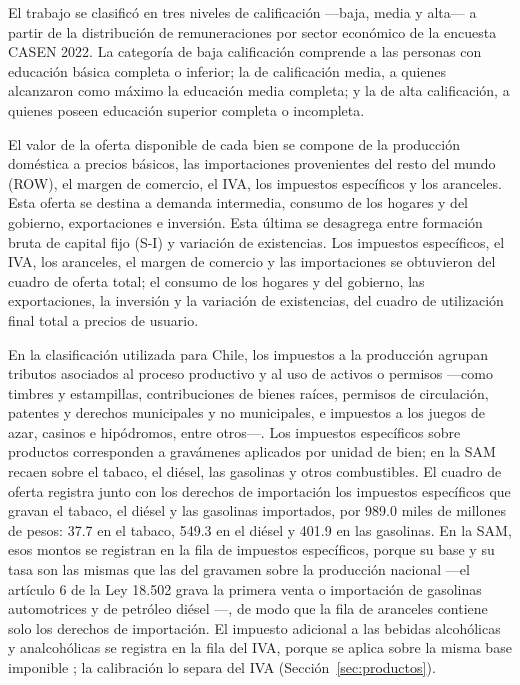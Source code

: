 \documentclass[11pt]{article}
\begin{document}
El trabajo se clasificó en tres niveles de calificación ---baja, media y alta--- a partir de la distribución de remuneraciones por sector económico de la encuesta CASEN 2022. La categoría de baja calificación comprende a las personas con educación básica completa o inferior; la de calificación media, a quienes alcanzaron como máximo la educación media completa; y la de alta calificación, a quienes poseen educación superior completa o incompleta.

El valor de la oferta disponible de cada bien se compone de la producción doméstica a precios básicos, las importaciones provenientes del resto del mundo (ROW), el margen de comercio, el IVA, los impuestos específicos y los aranceles. Esta oferta se destina a demanda intermedia, consumo de los hogares y del gobierno, exportaciones e inversión. Esta última se desagrega entre formación bruta de capital fijo (S-I) y variación de existencias. Los impuestos específicos, el IVA, los aranceles, el margen de comercio y las importaciones se obtuvieron del cuadro de oferta total; el consumo de los hogares y del gobierno, las exportaciones, la inversión y la variación de existencias, del cuadro de utilización final total a precios de usuario.

En la clasificación utilizada para Chile, los impuestos a la producción agrupan tributos asociados al proceso productivo y al uso de activos o permisos ---como timbres y estampillas, contribuciones de bienes raíces, permisos de circulación, patentes y derechos municipales y no municipales, e impuestos a los juegos de azar, casinos e hipódromos, entre otros---. Los impuestos específicos sobre productos corresponden a gravámenes aplicados por unidad de bien; en la SAM recaen sobre el tabaco, el diésel, las gasolinas y otros combustibles. El cuadro de oferta registra junto con los derechos de importación los impuestos específicos que gravan el tabaco, el diésel y las gasolinas importados, por 989.0 miles de millones de pesos: 37.7 en el tabaco, 549.3 en el diésel y 401.9 en las gasolinas. En la SAM, esos montos se registran en la fila de impuestos específicos, porque su base y su tasa son las mismas que las del gravamen sobre la producción nacional ---el artículo 6 de la Ley 18.502 grava la primera venta o importación de gasolinas automotrices y de petróleo diésel \cite{ley18502}---, de modo que la fila de aranceles contiene solo los derechos de importación. El impuesto adicional a las bebidas alcohólicas y analcohólicas se registra en la fila del IVA, porque se aplica sobre la misma base imponible \cite{dl825}; la calibración lo separa del IVA (Sección~\ref{sec:productos}).
\end{document}
